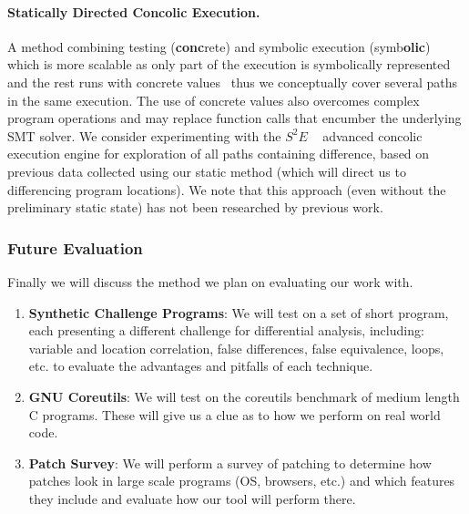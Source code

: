 \paragraph{Statically Directed Concolic Execution.} A method combining testing (\textbf{conc}rete) and symbolic execution (symb\textbf{olic}) which is more scalable as only part of the execution is symbolically represented and the rest runs with concrete values~\cite{ChipounovKuznetsovCandea12} thus we conceptually cover several paths in the same execution. The use of concrete values also overcomes complex program operations and may replace function calls that encumber the underlying SMT solver. We consider experimenting with the $S^{2}E$ ~\cite{ChipounovKuznetsovCandea12} advanced concolic execution engine for exploration of all paths containing difference, based on previous data collected using our static method (which will direct us to differencing program locations). We note that this approach (even without the preliminary static state) has not been researched by previous work.


\subsubsection{Future Evaluation}

Finally we will discuss the method we plan on evaluating our work with.
\begin{enumerate}
\item \textbf{Synthetic Challenge Programs}: We will test on a set of short program, each presenting a different challenge for differential analysis, including: variable and location correlation, false differences, false equivalence, loops, etc. to evaluate the advantages and pitfalls of each technique.
\item \textbf{GNU Coreutils}: We will test on the coreutils benchmark of medium length C programs. These will give us a clue as to how we perform on real world code.
\item \textbf{Patch Survey}: We will perform a survey of patching to determine how patches look in large scale programs (OS, browsers, etc.) and which features they include and evaluate how our tool will perform there.
\end{enumerate}


